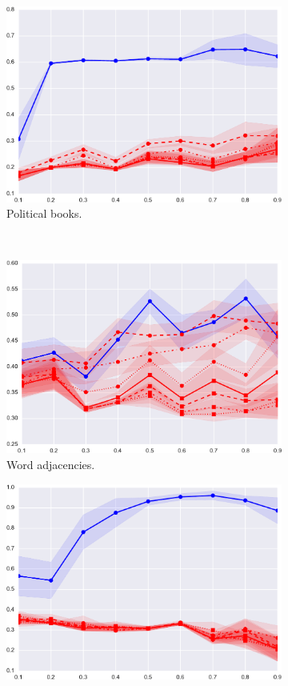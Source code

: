 \documentclass[sigconf, review]{acmart}
\begin{document}
\begin{figure}[h!]
\begin{subfigure}[t]{0.4\textwidth}
        \includegraphics[width=\hsize]{polbooks}
        \caption{Political books.}
    \end{subfigure}
    \\
    \begin{subfigure}[t]{0.4\textwidth}
        \centering
        \includegraphics[width=\hsize]{adjnoun}
        \caption{Word adjacencies.}
    \end{subfigure}
    \hfill
    \begin{subfigure}[t]{0.4\textwidth}
        \centering
        \includegraphics[width=\hsize]{karate}

\end{subfigure}
\end{figure}
\end{document}
